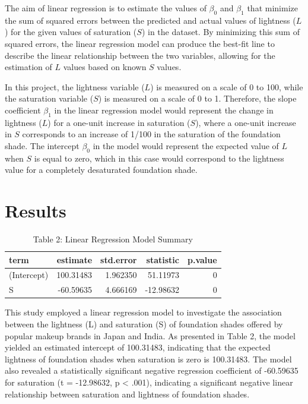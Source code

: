 \documentclass[
  letterpaper,
  DIV=11,
  numbers=noendperiod]{scrartcl}
\begin{document}
The aim of linear regression is to estimate the values of \(\beta_0\)
and \(\beta_1\) that minimize the sum of squared errors between the
predicted and actual values of lightness (\(L\)) for the given values of
saturation (\(S\)) in the dataset. By minimizing this sum of squared
errors, the linear regression model can produce the best-fit line to
describe the linear relationship between the two variables, allowing for
the estimation of \(L\) values based on known \(S\) values.

In this project, the lightness variable (\(L\)) is measured on a scale
of 0 to 100, while the saturation variable (\(S\)) is measured on a
scale of 0 to 1. Therefore, the slope coefficient \(\beta_1\) in the
linear regression model would represent the change in lightness (\(L\))
for a one-unit increase in saturation (\(S\)), where a one-unit increase
in \(S\) corresponds to an increase of 1/100 in the saturation of the
foundation shade. The intercept \(\beta_0\) in the model would represent
the expected value of \(L\) when \(S\) is equal to zero, which in this
case would correspond to the lightness value for a completely
desaturated foundation shade.

\newpage

\hypertarget{results}{%
\section{Results}\label{results}}

\begin{table}

\caption{Table 2: Linear Regression Model Summary}
\centering
\begin{tabular}[t]{l|r|r|r|r}
\hline
term & estimate & std.error & statistic & p.value\\
\hline
(Intercept) & 100.31483 & 1.962350 & 51.11973 & 0\\
\hline
S & -60.59635 & 4.666169 & -12.98632 & 0\\
\hline
\end{tabular}
\end{table}

This study employed a linear regression model to investigate the
association between the lightness (L) and saturation (S) of foundation
shades offered by popular makeup brands in Japan and India. As presented
in Table 2, the model yielded an estimated intercept of 100.31483,
indicating that the expected lightness of foundation shades when
saturation is zero is 100.31483. The model also revealed a statistically
significant negative regression coefficient of -60.59635 for saturation
(t = -12.98632, p \textless{} .001), indicating a significant negative
linear relationship between saturation and lightness of foundation
shades.
\end{document}
